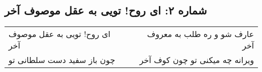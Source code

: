 \begin{center}
\section*{شماره ۲: ای روح! تویی به عقل موصوف آخر}
\label{sec:002}
\begin{longtable}{l p{0.5cm} r}
ای روح! تویی به عقل موصوف آخر
&&
عارف شو و ره طلب به معروف آخر
\\
چون باز سفید دست سلطانی تو
&&
ویرانه چه میکنی تو چون کوف آخر
\\
\end{longtable}
\end{center}
